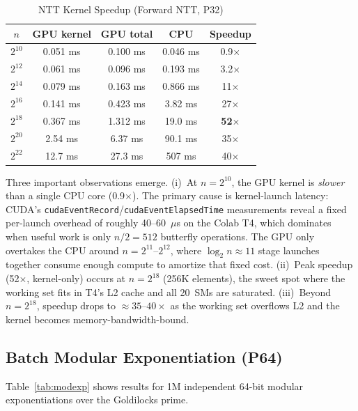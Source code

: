 \documentclass[conference]{IEEEtran}
\begin{document}
\begin{table}[t]
\caption{NTT Kernel Speedup (Forward NTT, P32)}
\label{tab:ntt}
\begin{center}
\begin{tabular}{|c|c|c|c|c|}
\hline
\textbf{$n$} & \textbf{GPU kernel} & \textbf{GPU total} & \textbf{CPU} & \textbf{Speedup} \\
\hline
$2^{10}$ & 0.051 ms & 0.100 ms & 0.046 ms & 0.9$\times$ \\
$2^{12}$ & 0.061 ms & 0.096 ms & 0.193 ms & 3.2$\times$ \\
$2^{14}$ & 0.079 ms & 0.163 ms & 0.866 ms & 11$\times$  \\
$2^{16}$ & 0.141 ms & 0.423 ms & 3.82 ms  & 27$\times$  \\
$2^{18}$ & 0.367 ms & 1.312 ms & 19.0 ms  & \textbf{52$\times$} \\
$2^{20}$ & 2.54 ms  & 6.37 ms  & 90.1 ms  & 35$\times$  \\
$2^{22}$ & 12.7 ms  & 27.3 ms  & 507 ms   & 40$\times$  \\
\hline
\end{tabular}
\end{center}
\end{table}

Three important observations emerge.
(i)~At $n=2^{10}$, the GPU kernel is \emph{slower} than a single CPU core
(0.9$\times$). The primary cause is kernel-launch latency: CUDA's
\texttt{cudaEventRecord}/\texttt{cudaEventElapsedTime} measurements reveal a
fixed per-launch overhead of roughly 40--60~$\mu$s on the Colab T4, which
dominates when useful work is only $n/2 = 512$ butterfly operations. The GPU
only overtakes the CPU around $n=2^{11}$--$2^{12}$, where $\log_2 n \approx 11$
stage launches together consume enough compute to amortize that fixed cost.
(ii)~Peak speedup (52$\times$, kernel-only) occurs at $n=2^{18}$ (256K
elements), the sweet spot where the working set fits in T4's L2 cache and all
20~SMs are saturated.
(iii)~Beyond $n=2^{18}$, speedup drops to $\approx35$--$40\times$ as the
working set overflows L2 and the kernel becomes memory-bandwidth-bound.

\subsection{Batch Modular Exponentiation (P64)}

Table~\ref{tab:modexp} shows results for 1M independent 64-bit modular
exponentiations over the Goldilocks prime.
\end{document}
